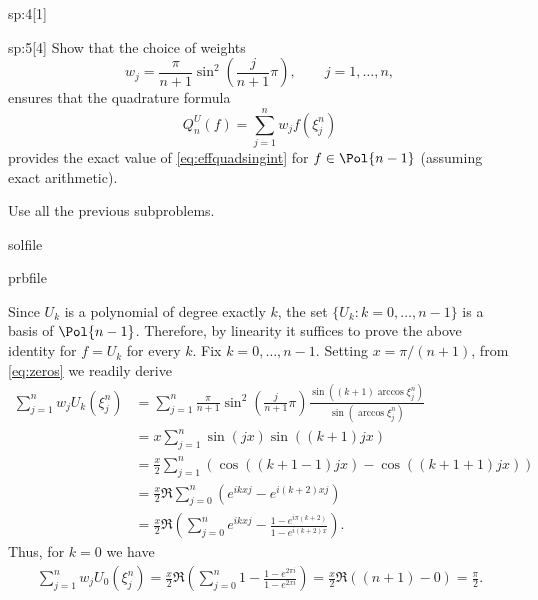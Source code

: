 \begin{samproblem}
\begin{subproblem}{sp:4}[1]
\end{subproblem}

\begin{subproblem}{sp:5}[4]
  Show that the choice of weights
  \begin{equation*}
    w_j=\frac{\pi}{n+1}\sin^2\left(\frac{j}{n+1}\pi\right),\qquad j=1,\dots, n,
  \end{equation*}
  ensures that the quadrature formula
  \begin{equation}\label{eq:quadrature_formula}
    Q^U_n(f)=\sum_{j=1}^n w_j f(\xi^n_j)
  \end{equation}
  provides the exact value of  \eqref{eq:effquadsingint} for $f\in\Pol{n-1}$ (assuming exact arithmetic).
  \begin{samhint}
    Use  all the previous subproblems.
  \end{samhint}
  \begin{samwriteprbpart}{solfile}
    \begin{writeverbatim}{prbfile}
      \begin{samsolution}
        Since $U_{k}$ is a polynomial of degree exactly $k$, the set $\{U_k:k=0,\dots,n-1\}$ is a basis of $\Pol{n-1}$. 
        Therefore, by linearity it suffices to prove the above identity for $f=U_k$ for every $k$. 
        Fix $k=0,\dots,n-1$. Setting $x=\pi/(n+1)$, from \eqref{eq:zeros} we readily derive
        \begin{align*}
          \sum_{j=1}^n w_j U_k(\xi^n_j) &= \sum_{j=1}^n \frac{\pi}{n+1}\sin^2\left(\frac{j}{n+1}\pi\right) 
          \frac{\sin((k+1)\arccos \xi^n_j)}{\sin(\arccos \xi^n_j)}\\
            &=  x \sum_{j=1}^n \sin(jx) \sin((k+1)jx)\\
            &=  \frac{x}{2} \sum_{j=1}^n\left(\cos((k+1-1)jx)-\cos((k+1+1)jx)\right)\\
            &=  \frac{x}{2}\Re \sum_{j=0}^n \left( e^{i k x j}-e^{i(k+2) x j}\right)\\
            &=  \frac{x}{2}\Re\left( \sum_{j=0}^n  e^{i k x j}-\frac{1-e^{i\pi(k+2)}}{1-e^{i (k+2) x }}\right).
        \end{align*}
        Thus, for $k=0$ we have
        \begin{align*}
          \sum_{j=1}^n w_j U_0(\xi^n_j) = \frac{x}{2}\Re\left( \sum_{j=0}^n  1-\frac{1-e^{2\pi i}}{1-e^{ 2 x i }}\right)
          = \frac{x}{2}\Re\left( (n+1)-0\right) = \frac{\pi}{2}.
        \end{align*}

\end{samsolution}
\end{writeverbatim}
\end{samwriteprbpart}
\end{subproblem}
\end{samproblem}
